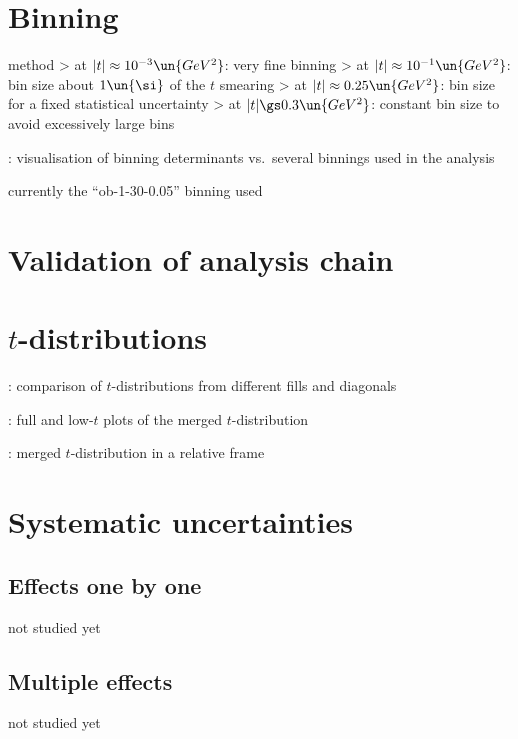 \section{Binning}

\> method
\>> at $|t| \approx 10^{-3}\un{GeV^2}$: very fine binning
\>> at $|t| \approx 10^{-1}\un{GeV^2}$: bin size about $1\un{\si}$ of the $t$ smearing
\>> at $|t| \approx 0.25\un{GeV^2}$: bin size for a fixed statistical uncertainty
\>> at $|t| \gs 0.3\un{GeV^2}$: constant bin size to avoid excessively large bins

\>  : visualisation of binning determinants vs.~several binnings used in
the analysis

\> currently the ``ob-1-30-0.05'' binning used



\section{Validation of analysis chain}



\section{$t$-distributions}

\> : comparison of $t$-distributions from different fills and diagonals

\> : full and low-$t$ plots of the merged $t$-distribution

\> : merged $t$-distribution in a relative frame


\section{Systematic uncertainties}

\subsection{Effects one by one}

\> not studied yet

\subsection{Multiple effects}

\> not studied yet



\bye

